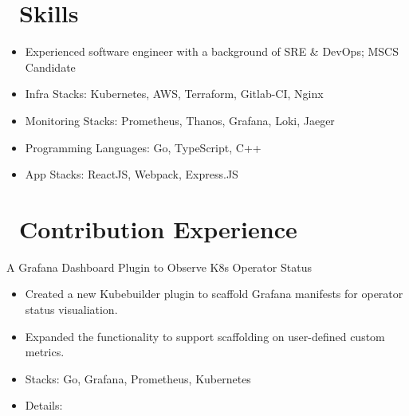 \documentclass{resume}
\begin{document}



\section{\faCogs\ Skills}
\begin{itemize}[parsep=0.5ex]
  \item Experienced software engineer with a background of SRE \& DevOps; MSCS Candidate
  \item Infra Stacks: Kubernetes, AWS, Terraform, Gitlab-CI, Nginx
  \item Monitoring Stacks: Prometheus, Thanos, Grafana, Loki, Jaeger
  \item Programming Languages: Go, TypeScript, C++
  \item App Stacks: ReactJS, Webpack, Express.JS
\end{itemize}

\section{\faUsers\ Contribution Experience}
A Grafana Dashboard Plugin to Observe K8s Operator Status
\begin{itemize}
  \item Created a new Kubebuilder plugin to scaffold Grafana manifests for operator status visualiation.
  \item Expanded the functionality to support scaffolding on user-defined custom metrics.
  \item Stacks: Go, Grafana, Prometheus, Kubernetes
  \item Details:
     \textperiodcentered\
     \textperiodcentered\
\end{itemize}
\end{document}
